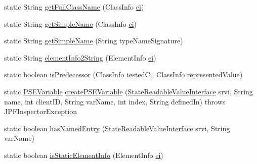 \begin{DoxyCompactItemize}
\item 
static String \hyperlink{classgov_1_1nasa_1_1jpf_1_1inspector_1_1server_1_1programstate_1_1_state_value_ab6efcb01d11093b4d9de33a220d0f204}{get\+Full\+Class\+Name} (Class\+Info \hyperlink{classgov_1_1nasa_1_1jpf_1_1inspector_1_1server_1_1programstate_1_1_state_value_a0eb4aa1e630ed6372dcfb8c41ae7edc5}{ci})
\item 
static String \hyperlink{classgov_1_1nasa_1_1jpf_1_1inspector_1_1server_1_1programstate_1_1_state_value_ad0fa5ab42fdeea38ce4fec44451ef680}{get\+Simple\+Name} (Class\+Info \hyperlink{classgov_1_1nasa_1_1jpf_1_1inspector_1_1server_1_1programstate_1_1_state_value_a0eb4aa1e630ed6372dcfb8c41ae7edc5}{ci})
\item 
static String \hyperlink{classgov_1_1nasa_1_1jpf_1_1inspector_1_1server_1_1programstate_1_1_state_value_a160cb94910e40bb87a81018116c92c09}{get\+Simple\+Name} (String type\+Name\+Signature)
\item 
static String \hyperlink{classgov_1_1nasa_1_1jpf_1_1inspector_1_1server_1_1programstate_1_1_state_value_aea337730b417cd995d983e1cbcff744e}{element\+Info2\+String} (Element\+Info \hyperlink{classgov_1_1nasa_1_1jpf_1_1inspector_1_1server_1_1programstate_1_1_state_value_element_info_field_a5e6f3ff034c98330007fe320eb5ec253}{ei})
\item 
static boolean \hyperlink{classgov_1_1nasa_1_1jpf_1_1inspector_1_1server_1_1programstate_1_1_state_value_aa23de04378976833758e7303f3d4cee6}{is\+Predecessor} (Class\+Info tested\+Ci, Class\+Info represented\+Value)
\item 
static \hyperlink{classgov_1_1nasa_1_1jpf_1_1inspector_1_1common_1_1pse_1_1_p_s_e_variable}{P\+S\+E\+Variable} \hyperlink{classgov_1_1nasa_1_1jpf_1_1inspector_1_1server_1_1programstate_1_1_state_value_a899ba1974881fe409b9b58d0ba90f3b5}{create\+P\+S\+E\+Variable} (\hyperlink{interfacegov_1_1nasa_1_1jpf_1_1inspector_1_1server_1_1programstate_1_1_state_readable_value_interface}{State\+Readable\+Value\+Interface} srvi, String name, int client\+ID, String var\+Name, int index, String defined\+In)  throws J\+P\+F\+Inspector\+Exception 
\item 
static boolean \hyperlink{classgov_1_1nasa_1_1jpf_1_1inspector_1_1server_1_1programstate_1_1_state_value_acf7b963024cd7f1cd5c23975621f83c7}{has\+Named\+Entry} (\hyperlink{interfacegov_1_1nasa_1_1jpf_1_1inspector_1_1server_1_1programstate_1_1_state_readable_value_interface}{State\+Readable\+Value\+Interface} srvi, String var\+Name)
\item 
static boolean \hyperlink{classgov_1_1nasa_1_1jpf_1_1inspector_1_1server_1_1programstate_1_1_state_value_a25dfd1e417420303104033dd3342c659}{is\+Static\+Element\+Info} (Element\+Info \hyperlink{classgov_1_1nasa_1_1jpf_1_1inspector_1_1server_1_1programstate_1_1_state_value_element_info_field_a5e6f3ff034c98330007fe320eb5ec253}{ei})
\end{DoxyCompactItemize}
